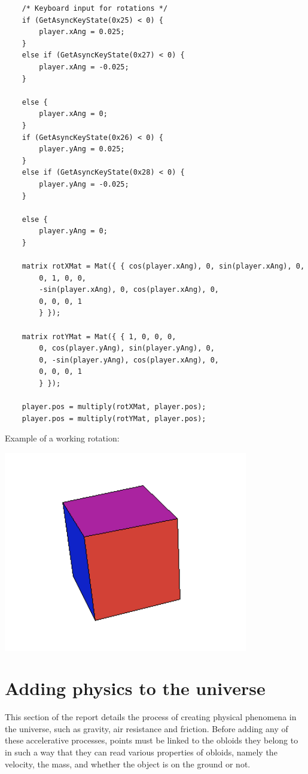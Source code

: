 \documentclass{article}
\begin{document}
\begin{lstlisting}
	/* Keyboard input for rotations */
	if (GetAsyncKeyState(0x25) < 0) {
		player.xAng = 0.025;
	}
	else if (GetAsyncKeyState(0x27) < 0) {
		player.xAng = -0.025;
	}

	else {
		player.xAng = 0;
	}
	if (GetAsyncKeyState(0x26) < 0) {
		player.yAng = 0.025;
	}
	else if (GetAsyncKeyState(0x28) < 0) {
		player.yAng = -0.025;
	}

	else {
		player.yAng = 0;
	}

	matrix rotXMat = Mat({ { cos(player.xAng), 0, sin(player.xAng), 0,
		0, 1, 0, 0,
		-sin(player.xAng), 0, cos(player.xAng), 0,
		0, 0, 0, 1
		} });

	matrix rotYMat = Mat({ { 1, 0, 0, 0,
		0, cos(player.yAng), sin(player.yAng), 0,
		0, -sin(player.yAng), cos(player.xAng), 0,
		0, 0, 0, 1
		} });

	player.pos = multiply(rotXMat, player.pos);
	player.pos = multiply(rotYMat, player.pos);
\end{lstlisting}
Example of a working rotation:
\newline
\begin{center}
\includegraphics[width=0.8\textwidth]{rotated_cube.png}
\end{center}
\section{Adding physics to the universe}
This section of the report details the process of creating physical phenomena in the universe, such as gravity, air resistance and friction. Before adding any of these accelerative processes, points must be linked to the obloids they belong to in such a way that they can read various properties of obloids, namely the velocity, the mass, and whether the object is on the ground or not.
\end{document}
